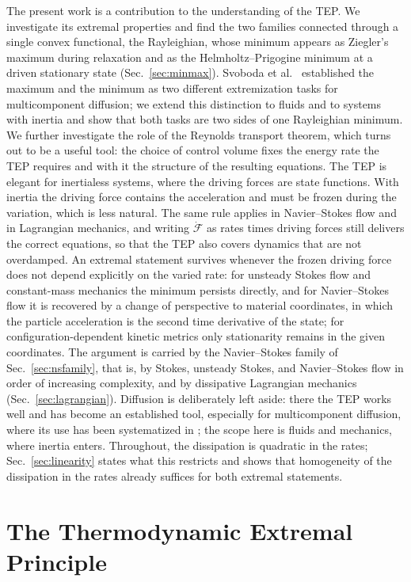 \documentclass[aip,pof,reprint,amsmath,amssymb,longbibliography]{revtex4-2}
\begin{document}
The present work is a contribution to the understanding of the TEP. We investigate its extremal properties and find the two families connected through a single convex functional, the Rayleighian, whose minimum appears as Ziegler's maximum during relaxation and as the Helmholtz--Prigogine minimum at a driven stationary state (Sec.~\ref{sec:minmax}). Svoboda et al.\ \cite{svoboda2023note} established the maximum and the minimum as two different extremization tasks for multicomponent diffusion; we extend this distinction to fluids and to systems with inertia and show that both tasks are two sides of one Rayleighian minimum. We further investigate the role of the Reynolds transport theorem, which turns out to be a useful tool: the choice of control volume fixes the energy rate the TEP requires and with it the structure of the resulting equations. The TEP is elegant for inertialess systems, where the driving forces are state functions. With inertia the driving force contains the acceleration and must be frozen during the variation, which is less natural. The same rule applies in Navier--Stokes flow and in Lagrangian mechanics, and writing $\dot{\mathcal{F}}$ as rates times driving forces still delivers the correct equations, so that the TEP also covers dynamics that are not overdamped. An extremal statement survives whenever the frozen driving force does not depend explicitly on the varied rate: for unsteady Stokes flow and constant-mass mechanics the minimum persists directly, and for Navier--Stokes flow it is recovered by a change of perspective to material coordinates, in which the particle acceleration is the second time derivative of the state; for configuration-dependent kinetic metrics only stationarity remains in the given coordinates. The argument is carried by the Navier--Stokes family of Sec.~\ref{sec:nsfamily}, that is, by Stokes, unsteady Stokes, and Navier--Stokes flow in order of increasing complexity, and by dissipative Lagrangian mechanics (Sec.~\ref{sec:lagrangian}). Diffusion is deliberately left aside: there the TEP works well and has become an established tool, especially for multicomponent diffusion, where its use has been systematized in \cite{flachberger2024}; the scope here is fluids and mechanics, where inertia enters. Throughout, the dissipation is quadratic in the rates; Sec.~\ref{sec:linearity} states what this restricts and shows that homogeneity of the dissipation in the rates already suffices for both extremal statements.


\section{The Thermodynamic Extremal Principle}
\label{sec:tep}
\end{document}
